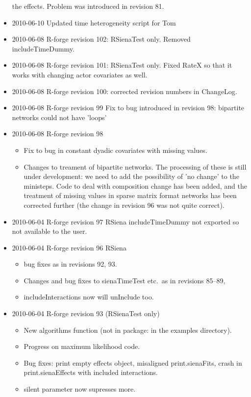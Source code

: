 \documentclass[a4paper,fleqn,11pt]{article}
\newcommand{\+}{\, + \,}
\newcommand{\sfn}[1]{\textsf{#1}}
\begin{document}
\begin{small}
\begin{itemize}
  the effects. Problem was introduced in revision 81.
\item 2010-06-10 Updated time heterogeneity script for Tom
\item 2010-06-08 R-forge revision 102: RSienaTest only. Removed
includeTimeDummy.
\item 2010-06-08 R-forge revision 101: RSienaTest only. Fixed RateX so that it
  works with changing actor covariates as well.
\item 2010-06-08 R-forge revision 100: corrected revision numbers in \sfn{ChangeLog}.
\item 2010-06-08 R-forge revision 99
Fix to bug introduced in revision 98: bipartite networks could not have 'loops'
\item 2010-06-08 R-forge revision 98
\begin{itemize}
\item Fix to bug in constant dyadic covariates with missing values.
\item Changes to treament of bipartite networks. The processing of these is
  still under development: we need to add the possibility of 'no change' to the
  ministeps. Code to deal with composition change has been added, and the
  treatment of missing values in sparse matrix format networks has been
  corrected further (the change in revision 96 was not quite correct).
\end{itemize}
\item 2010-06-04 R-forge revision 97 RSiena includeTimeDummy not exported so not
  available to the user.
\item 2010-06-04 R-forge revision 96 RSiena
\begin{itemize}
\item bug fixes as in revisions 92, 93.
\item Changes and bug fixes to sienaTimeTest etc.\ as in revisions 85--89,
\item \sfn{includeInteractions} now will unInclude too.
\end{itemize}
\item 2010-06-04 R-forge revision 93 (RSienaTest only)
\begin{itemize}\item New algorithms function
  (not in package: in the examples directory).
\item Progress on maximum likelihood code.
\item Bug fixes: print empty effects object, misaligned print.sienaFits, crash
  in print.sienaEffects with included interactions.
\item silent parameter now supresses more.

\end{itemize}
\end{itemize}
\end{small}
\end{document}
